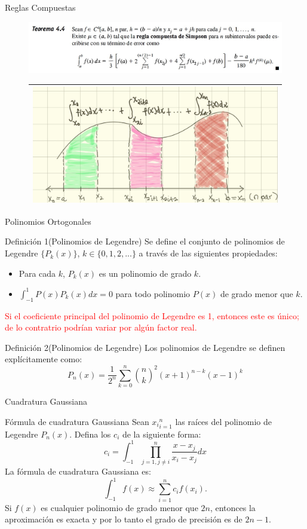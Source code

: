 \begin{frame}{Reglas Compuestas}
\begin{figure}[H]
\centering
\includegraphics[scale=0.4]{Imagen9}
\begin{tabular}{|c|}
\hline
\includegraphics[scale=0.2]{Imagen11}\\
\hline
\end{tabular}
\end{figure}
\end{frame}
\begin{frame}{Polinomios Ortogonales}
\begin{block}{Definición 1(Polinomios de Legendre)}
Se define el conjunto de polinomios de Legendre $\{P_k(x)\}$, $k \in \{0,1,2,...\}$ a través de las siguientes propiedades:
\begin{itemize}
\item Para cada $k$, $P_k(x)$ es un polinomio de grado $k$.
\item $\displaystyle \int_{-1}^{1}P(x)P_k(x)dx=0 $ para todo polinomio $P(x)$ de grado menor que $k$. 
\end{itemize}
\end{block}\pause
\textcolor{red}{Si el coeficiente principal del polinomio de Legendre es 1, entonces este es único; de lo contratrio podrían variar por algún factor real. }
\begin{block}{Definición 2(Polinomios de Legendre)}
Los polinomios de Legendre se definen explícitamente como:
$$P_n(x)=\dfrac{1}{2^n}\sum_{k=0}^{n}\binom{n}{k}^2(x+1)^{n-k}(x-1)^k$$
\end{block}
\end{frame}
\begin{frame}{Cuadratura Gaussiana}
\begin{block}{Fórmula de cuadratura Gaussiana}
Sean ${x_i}_{i=1}^{n}$ las raíces del polinomio de Legendre $P_n(x)$. Defina los $c_i$ de la siguiente forma:
$$c_i=\int_{-1}^{1}\prod _{j=1,j\neq i}^{n}\dfrac{x-x_j}{x_i-x_j}dx$$
La fórmula de cuadratura Gaussiana es:
$$\int_{-1}^{1}f(x)\approx\sum_{i=1}^{n}c_if(x_i).$$
Si $f(x)$ es cualquier polinomio de grado menor que $2n$, entonces la aproximación es exacta y por lo tanto el grado de precisión es de $2n-1$.
\end{block}
\end{frame}
